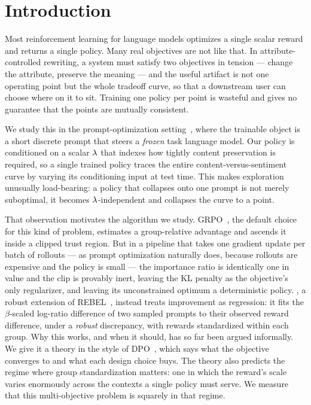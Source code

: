 \section{Introduction}
\label{sec:intro}

Most reinforcement learning for language models optimizes a single scalar
reward and returns a single policy. Many real objectives are not like that. In
attribute-controlled rewriting, a system must satisfy two objectives in tension
--- change the attribute, preserve the meaning --- and the useful artifact is
not one operating point but the whole tradeoff curve, so that a downstream user
can choose where on it to sit. Training one policy per point is wasteful and
gives no guarantee that the points are mutually consistent.

We study this in the prompt-optimization setting~\citep{deng2022rlprompt}, where the trainable object is
a short discrete prompt that steers a \emph{frozen} task language model. Our
policy is conditioned on a scalar $\lambda$ that indexes how tightly content
preservation is required, so a single trained policy traces the entire
content-versus-sentiment curve by varying its conditioning input at test time.
This makes exploration unusually load-bearing: a policy that collapses onto one
prompt is not merely suboptimal, it becomes $\lambda$-independent and collapses the
curve to a point.

That observation motivates the algorithm we study. GRPO~\citep{shao2024deepseekmath}, the default choice for
this kind of problem, estimates a group-relative advantage and ascends it inside
a clipped trust region. But in a pipeline that takes one gradient update per
batch of rollouts --- as prompt optimization naturally does, because rollouts
are expensive and the policy is small --- the importance ratio is identically
one in value and the clip is provably inert, leaving the KL penalty as the objective's
only regularizer, and leaving its unconstrained optimum a deterministic policy.
\rrebel{}, a robust extension of REBEL~\citep{gao2024rebel}, instead treats
improvement as regression: it fits the $\beta$-scaled
log-ratio difference of two sampled prompts to their observed reward difference,
under a \emph{robust} discrepancy, with rewards standardized within each group.
Why this works, and when it should, has so far been argued informally. We give
it a theory in the style of DPO~\citep{rafailov2023dpo}, which says what the
objective converges to and what each design choice buys. The theory also
predicts the regime where group standardization matters: one in which the
reward's scale varies enormously across the contexts a single policy must
serve. We measure that this multi-objective problem is squarely in that
regime.

